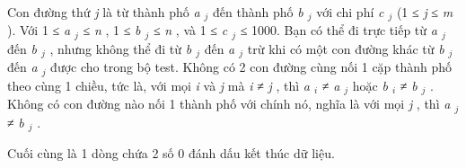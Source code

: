       Con đường thứ      \emph{       j      }      là từ thành phố      \emph{       a       $_        j       $}      đến thành phố      \emph{       b       $_        j       $}      với chi phí      \emph{       c       $_        j       $}      (1 ≤      \emph{       j      }      ≤      \emph{       m      }      ). Với 1 ≤      \emph{       a       $_        j       $}      ≤      \emph{       n      }      , 1 ≤      \emph{       b       $_        j       $}      ≤      \emph{       n      }      , và 1 ≤      \emph{       c       $_        j       $}      ≤ 1000. Bạn có thể đi trực tiếp từ      \emph{       a       $_        j       $}      đến      \emph{       b       $_        j       $}      , nhưng không thể đi từ      \emph{       b       $_        j       $}      đến      \emph{       a       $_        j       $}      trừ khi có một con đường khác từ      \emph{       b       $_        j       $}      đến      \emph{       a       $_        j       $}      được cho trong bộ test. Không có 2 con đường cùng nối 1 cặp thành phố theo cùng 1 chiều, tức là, với mọi      \emph{       i      }      và      \emph{       j      }      mà      \emph{       i      }      ≠      \emph{       j      }      , thì      \emph{       a       $_        i       $}      ≠      \emph{       a       $_        j       $}      hoặc      \emph{       b       $_        i       $}      ≠      \emph{       b       $_        j       $}      . Không có con đường nào nối 1 thành phố với chính nó, nghĩa là với mọi      \emph{       j      }      , thì      \emph{       a       $_        j       $}      ≠      \emph{       b       $_        j       $}      .     

      Cuối cùng là 1 dòng chứa 2 số 0 đánh dấu kết thúc dữ liệu.
